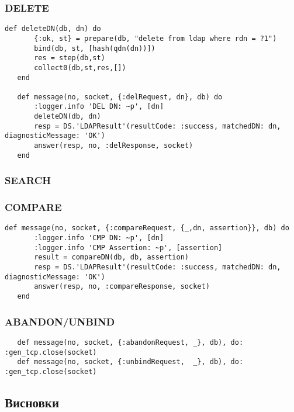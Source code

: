 \subsubsection{DELETE}

\begin{lstlisting}
def deleteDN(db, dn) do
       {:ok, st} = prepare(db, "delete from ldap where rdn = ?1")
       bind(db, st, [hash(qdn(dn))])
       res = step(db,st)
       collect0(db,st,res,[])
   end

   def message(no, socket, {:delRequest, dn}, db) do
       :logger.info 'DEL DN: ~p', [dn]
       deleteDN(db, dn)
       resp = DS.'LDAPResult'(resultCode: :success, matchedDN: dn, diagnosticMessage: 'OK')
       answer(resp, no, :delResponse, socket)
   end
\end{lstlisting}

\subsubsection{SEARCH}

\subsubsection{COMPARE}

\begin{lstlisting}
def message(no, socket, {:compareRequest, {_,dn, assertion}}, db) do
       :logger.info 'CMP DN: ~p', [dn]
       :logger.info 'CMP Assertion: ~p', [assertion]
       result = compareDN(db, db, assertion)
       resp = DS.'LDAPResult'(resultCode: :success, matchedDN: dn, diagnosticMessage: 'OK')
       answer(resp, no, :compareResponse, socket)
   end
\end{lstlisting}

\subsubsection{ABANDON/UNBIND}

\begin{lstlisting}
   def message(no, socket, {:abandonRequest, _}, db), do: :gen_tcp.close(socket)
   def message(no, socket, {:unbindRequest,  _}, db), do: :gen_tcp.close(socket)
\end{lstlisting}

\subsection{Висновки}

